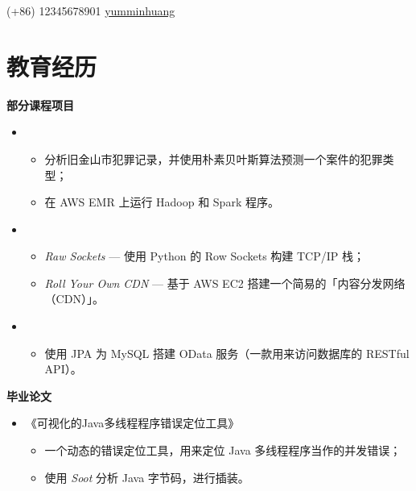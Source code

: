\documentclass{resume}
\begin{document}


{(+86) 12345678901}
{\href{https://github.com/yumminhuang}{yumminhuang}}


\section{教育经历}
\textbf{部分课程项目}
\begin{itemize}
\item {}
\begin{itemize}
\item 分析旧金山市犯罪记录，并使用朴素贝叶斯算法预测一个案件的犯罪类型；
\item 在 AWS EMR 上运行 Hadoop 和 Spark 程序。
\end{itemize}

\item {}
\begin{itemize}
\item \textit{Raw Sockets} --- 使用 Python 的 Row Sockets 构建 TCP/IP 栈；
\item \textit{Roll Your Own CDN} --- 基于 AWS EC2 搭建一个简易的「内容分发网络（CDN）」。
\end{itemize}

\item {}
\begin{itemize}
\item 使用 JPA 为 MySQL 搭建 OData 服务（一款用来访问数据库的 RESTful API）。
\end{itemize}
\end{itemize}

\textbf{毕业论文}
\begin{itemize}
\item 《可视化的Java多线程程序错误定位工具》
\begin{itemize}
\item 一个动态的错误定位工具，用来定位 Java 多线程程序当作的并发错误；
\item 使用 \textit{Soot} 分析 Java 字节码，进行插装。
\end{itemize}
\end{itemize}
\end{document}
